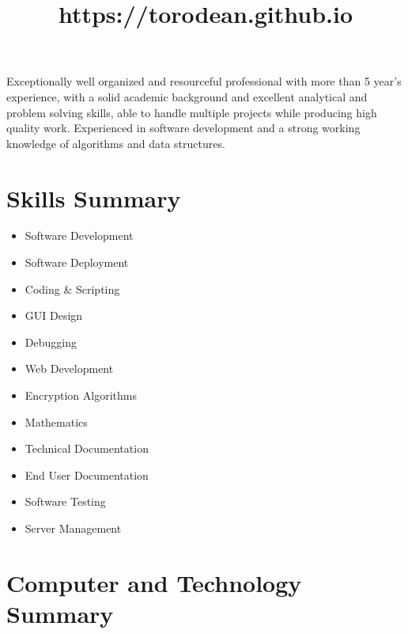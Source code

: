 \documentclass[11pt,a4paper,sans]{moderncv} %
\title{https://torodean.github.io}
\begin{document}
\makecvtitle %


Exceptionally well organized and resourceful professional with more than 5 year’s experience, with a solid academic background and excellent analytical and problem solving skills, able to handle multiple projects while producing high quality work. Experienced in software development and a strong working knowledge of algorithms and data structures.	


\section{Skills Summary}

\begin{multicols}{3}
	\begin{itemize}
	\item Software Development
	\item Software Deployment
	\item Coding \& Scripting
	\item GUI Design
	\item Debugging
	\item Web Development
	\item Encryption Algorithms
	\item Mathematics
	\item Technical Documentation
	\item End User Documentation
	\item Software Testing
	\item Server Management
	\end{itemize}
\end{multicols}


\section{Computer and Technology Summary}
\end{document}
